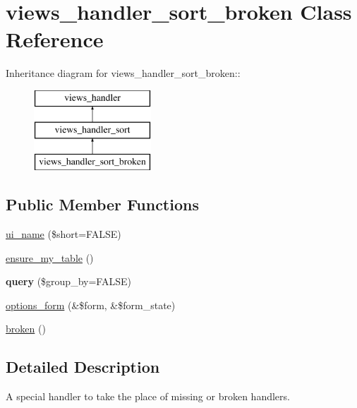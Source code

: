 \hypertarget{classviews__handler__sort__broken}{
\section{views\_\-handler\_\-sort\_\-broken Class Reference}
\label{classviews__handler__sort__broken}
}
Inheritance diagram for views\_\-handler\_\-sort\_\-broken::\begin{figure}[H]
\begin{center}
\leavevmode
\includegraphics[height=3cm]{classviews__handler__sort__broken}
\end{center}
\end{figure}
\subsection*{Public Member Functions}
\begin{DoxyCompactItemize}
\item 
\hyperlink{classviews__handler__sort__broken_ad83cfcffa971a65b6e306d6fac7f6c10}{ui\_\-name} (\$short=FALSE)
\item 
\hyperlink{classviews__handler__sort__broken_a148e3b71f7327ed44a139ecefbd1d43b}{ensure\_\-my\_\-table} ()
\item 
\hypertarget{classviews__handler__sort__broken_aa620003d0d2e27863736882254237b1e}{
{\bfseries query} (\$group\_\-by=FALSE)}
\label{classviews__handler__sort__broken_aa620003d0d2e27863736882254237b1e}

\item 
\hyperlink{classviews__handler__sort__broken_a57d7f6176962083d4c17cbf448cb792f}{options\_\-form} (\&\$form, \&\$form\_\-state)
\item 
\hyperlink{classviews__handler__sort__broken_a082f810e9181d6b2f878013897e3cc17}{broken} ()
\end{DoxyCompactItemize}


\subsection{Detailed Description}
A special handler to take the place of missing or broken handlers. 

